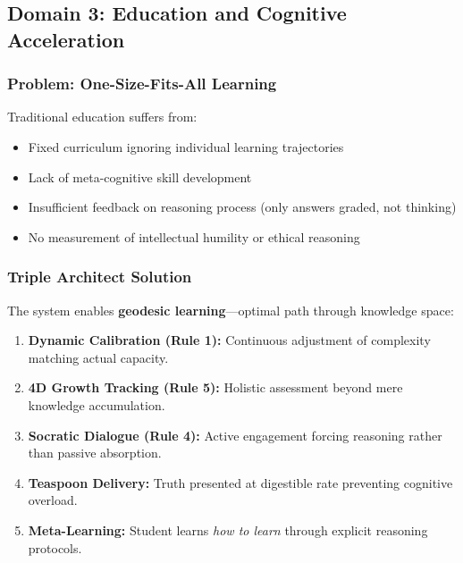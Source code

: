\documentclass[11pt,a4paper]{article}
\theoremstyle{definition}
\theoremstyle{remark}
\begin{document}
\subsection{Domain 3: Education and Cognitive Acceleration}

\subsubsection{Problem: One-Size-Fits-All Learning}

Traditional education suffers from:
\begin{itemize}
    \item Fixed curriculum ignoring individual learning trajectories
    \item Lack of meta-cognitive skill development
    \item Insufficient feedback on reasoning process (only answers graded, not thinking)
    \item No measurement of intellectual humility or ethical reasoning
\end{itemize}

\subsubsection{Triple Architect Solution}

The system enables \textbf{geodesic learning}—optimal path through knowledge space:

\begin{enumerate}
    \item \textbf{Dynamic Calibration (Rule 1):} Continuous adjustment of complexity matching actual capacity.
    
    \item \textbf{4D Growth Tracking (Rule 5):} Holistic assessment beyond mere knowledge accumulation.
    
    \item \textbf{Socratic Dialogue (Rule 4):} Active engagement forcing reasoning rather than passive absorption.
    
    \item \textbf{Teaspoon Delivery:} Truth presented at digestible rate preventing cognitive overload.
    
    \item \textbf{Meta-Learning:} Student learns \textit{how to learn} through explicit reasoning protocols.
\end{enumerate}
\end{document}
